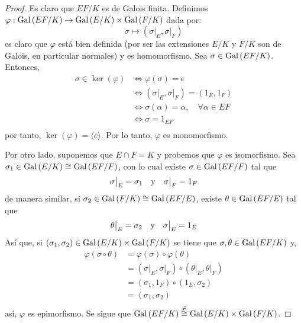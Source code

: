 \documentclass[12pt]{report}
\theoremstyle{largebreak}
\newcommand\cf[3]{\ensuremath{#1:#2\rightarrow#3}}
\begin{document}
    \begin{proof}
        Es claro que $EF/K$ es de Galois finita. Definimos $\cf{\varphi}{\Gal{EF/K}}{\Gal{E/K}\times\Gal{F/K}}$ dada por:
        \begin{equation*}
            \sigma\mapsto (\sigma\big|_E,\sigma\big|_F)
        \end{equation*}
        es claro que $\varphi$ está bien definida (por ser las extensiones $E/K$ y $F/K$ son de Galois, en particular normales) y es homomorfismo. Sea $\sigma\in\textup{Gal}\left(EF/K\right)$. Entonces,
        \begin{equation*}
            \begin{split}
                \sigma\in\ker(\varphi)&\iff \varphi(\sigma)=e\\
                &\iff (\sigma\big|_E,\sigma\big|_F)=(1_E,1_F)\\
                &\iff \sigma(\alpha)=\alpha,\quad\forall\alpha\in EF\\
                &\iff \sigma=1_{EF}\\
            \end{split}
        \end{equation*}
        por tanto, $\ker(\varphi)=\langle e\rangle$. Por lo tanto, $\varphi$ es monomorfismo.

        Por otro lado, suponemos que $E\cap F=K$ y probemos que $\varphi$ es isomorfismo. Sea $\sigma_1\in\textup{Gal}\left(E/K\right)\cong\textup{Gal}\left(EF/F\right)$, con lo cual existe $\sigma\in\textup{Gal}\left(EF/F\right)$ tal que
        \begin{equation*}
            \sigma\big|_E=\sigma_1\quad\textup{y}\quad\sigma\big|_F=1_F
        \end{equation*}
        de manera similar, si $\sigma_2\in\textup{Gal}\left(F/K\right)\cong\textup{Gal}\left(EF/E\right)$, existe $\theta\in\textup{Gal}\left(EF/E\right)$ tal que
        \begin{equation*}
            \theta\big|_E=\sigma_2\quad\textup{y}\quad\sigma\big|_E=1_E
        \end{equation*}
        Así que, si $(\sigma_1,\sigma_2)\in\textup{Gal}\left(E/K\right)\times\textup{Gal}\left(F/K\right)$ se tiene que $\sigma,\theta\in\textup{Gal}\left(EF/K\right)$ y,
        \begin{equation*}
            \begin{split}
                \varphi(\sigma\circ\theta)&=\varphi(\sigma)\circ\varphi(\theta)\\
                &=(\sigma\big|_E,\sigma\big|_F)\circ(\theta\big|_E,\theta\big|_F)\\
                &=(\sigma_1,1_F)\circ (1_E,\sigma_2)\\
                &=(\sigma_1,\sigma_2)\\
            \end{split}
        \end{equation*}
        así, $\varphi$ es epimorfismo. Se sigue que $\textup{Gal}\left(EF/K\right)\overset{\varphi}{\cong}\textup{Gal}\left(E/K\right)\times\textup{Gal}\left(F/K\right)$.
    \end{proof}
\end{document}
